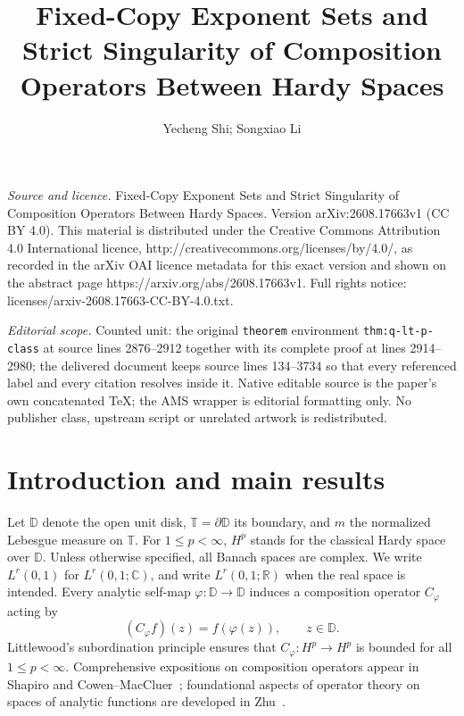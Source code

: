 \documentclass[10pt,a4paper]{amsart}
\newcommand{\D}{\mathbb{D}}
\newcommand{\T}{\mathbb{T}}
\newcommand{\C}{\mathbb{C}}
\newcommand{\R}{\mathbb{R}}
\begin{document}
\title[Fixed-Copy Exponent Sets and Strict Singularity of Compositi]{Fixed-Copy Exponent Sets and Strict Singularity of Composition Operators Between Hardy Spaces}
\author{Yecheng Shi; Songxiao Li}
\date{}
\maketitle
\noindent\emph{Source and licence.} Fixed-Copy Exponent Sets and Strict Singularity of Composition Operators Between Hardy Spaces. Version arXiv:2608.17663v1 (CC BY 4.0). This material is distributed under the Creative Commons Attribution 4.0 International licence, http://creativecommons.org/licenses/by/4.0/, as recorded in the arXiv OAI licence metadata for this exact version and shown on the abstract page https://arxiv.org/abs/2608.17663v1. Full rights notice: licenses/arxiv-2608.17663-CC-BY-4.0.txt.\par\smallskip
\noindent\textit{Editorial scope.} Counted unit: the original \texttt{theorem} environment \texttt{thm:q-lt-p-class} at source lines 2876--2912 together with its complete proof at lines 2914--2980; the delivered document keeps source lines 134--3734 so that every referenced label and every citation resolves inside it. Native editable source is the paper's own concatenated TeX; the AMS wrapper is editorial formatting only. No publisher class, upstream script or unrelated artwork is redistributed.
\section{Introduction and main results}
\label{sec:intro}


Let \(\D\) denote the open unit disk, \(\T=\partial\D\) its boundary,
and \(m\) the normalized Lebesgue measure on \(\T\). For $1\le p<\infty$, $H^{p}$
stands for the classical Hardy space over $\D$. 
Unless otherwise specified, all Banach spaces are complex.
We write \(L^r(0,1)\) for \(L^r(0,1;\C)\), and write
\(L^r(0,1;\R)\) when the real space is intended.
Every analytic self-map
$\varphi:\D\to\D$ induces a composition operator $C_{\varphi}$ acting by
\[
(C_{\varphi}f)(z)=f(\varphi(z)),\qquad z\in\D.
\]
Littlewood's subordination principle ensures that
$C_{\varphi}:H^{p}\to H^{p}$ is bounded for all $1\le p<\infty$.
Comprehensive expositions on composition operators appear in Shapiro \cite{Shapiro1993} 
and Cowen--MacCluer~\cite{CowenMacCluer1995}; foundational aspects of operator theory on spaces of
analytic functions are developed in Zhu~\cite{Zhu2007}.
\end{document}
